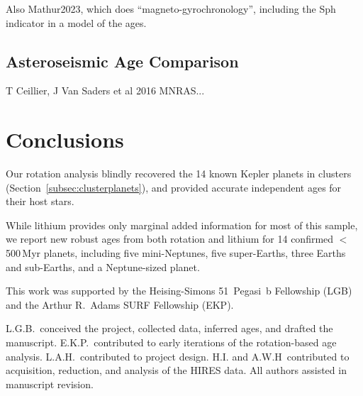 \documentclass[11pt,twocolumn,tighten]{aastex63}
\begin{document}
Also Mathur2023, which does ``magneto-gyrochronology'', including the
Sph indicator in a model of the ages.


\subsection{Asteroseismic Age Comparison}
T Ceillier, J Van Saders et al 2016 MNRAS...


\section{Conclusions}
\label{sec:conclusions}

Our rotation analysis blindly recovered the 14 known Kepler planets in
clusters (Section~\ref{subsec:clusterplanets}), and provided accurate
independent ages for their host stars.

While lithium provides only marginal added information for most of
this sample, we report new robust ages from both rotation and
lithium for 14 confirmed $<$500\,Myr planets, including five
mini-Neptunes, five super-Earths, three Earths and sub-Earths, and a
Neptune-sized planet.




\acknowledgements
This work was supported by the 
Heising-Simons 51~Pegasi~b Fellowship (LGB)
and the Arthur R.~Adams SURF Fellowship (EKP).

L.G.B.~conceived the project, collected data, 
inferred ages, and drafted the manuscript.
E.K.P.~contributed to early iterations of the rotation-based age analysis.
L.A.H.~contributed to project design.
H.I. and A.W.H~contributed to acquisition, reduction, and analysis of
the HIRES data.
All authors assisted in manuscript revision.




\clearpage 
\end{document}
